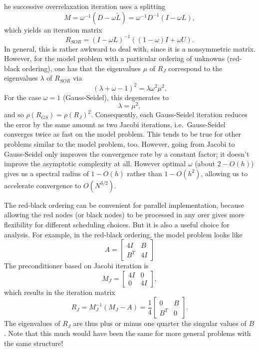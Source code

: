 he successive overrelaxation iteration uses a splitting
\[
  M = \omega^{-1} (D - \omega \tilde{L}) = \omega^{-1} D^{-1} (I-\omega L),
\]
which yields an iteration matrix
\[
  R_{SOR} = (I-\omega L)^{-1} ( (1-\omega) I + \omega U).
\]
In general, this is rather awkward to deal with, since it is a
nonsymmetric matrix.  However, for the model problem with a particular
ordering of unknowns (red-black ordering), one has that the
eigenvalues $\mu$ of $R_{J}$ correspond to the eigenvalues $\lambda$
of $R_{SOR}$ via
\[
  (\lambda + \omega - 1)^2 = \lambda \omega^2 \mu^2.
\]
For the case $\omega = 1$ (Gauss-Seidel), this degenerates to
\[
  \lambda = \mu^2,
\]
and so $\rho(R_{GS}) = \rho(R_J)^2$.  Consequently, each Gauss-Seidel
iteration reduces the error by the same amount as two Jacobi
iterations, i.e.~Gauss-Seidel converges twice as fast on the model
problem.  This tends to be true for other problems similar to the
model problem, too.  However, going from Jacobi to Gauss-Seidel only
improves the convergence rate by a constant factor; it doesn't improve
the asymptotic complexity at all.  However optimal $\omega$ (about $2 -
O(h)$) gives us a spectral radius of $1-O(h)$ rather than $1-O(h^2)$,
allowing us to accelerate convergence to $O(N^{3/2})$.

The red-black ordering can be convenient for parallel implementation,
because allowing the red nodes (or black nodes) to be processed in any
orer gives more flexibility for different scheduling choices.  But it
is also a useful choice for analysis.  For example, in the red-black
ordering, the model problem looks like
\[
  A = \begin{bmatrix} 4I & B \\ B^T & 4I \end{bmatrix}
\]
The preconditioner based on Jacobi iteration is
\[
  M_J = \begin{bmatrix} 4I & 0 \\ 0 & 4 I \end{bmatrix},
\]
which results in the iteration matrix
\[
  R_J = M_J^{-1} (M_J-A) =
  \frac{1}{4} \begin{bmatrix} 0 & B \\ B^T & 0 \end{bmatrix}.
\]
The eigenvalues of $R_J$ are thus plus or minus one quarter the
singular values of $B$.  Note that this much would have been the same
for more general problems with the same structure!

